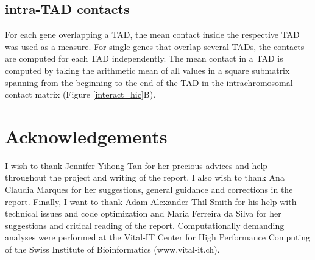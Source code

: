 \documentclass[11pt,a4paper]{report}
\begin{document}
\subsection*{intra-TAD contacts}

For each gene overlapping a TAD, the mean contact inside the respective TAD was used as a measure. For single genes that overlap several TADs, the contacts are computed for each TAD independently. The mean contact in a TAD is computed by taking the arithmetic mean of all values in a square submatrix spanning from the beginning to the end of the TAD in the intrachromosomal contact matrix (Figure \ref{interact_hic}B).

\section*{Acknowledgements}
I wish to thank Jennifer Yihong Tan for her precious advices and help throughout the project and writing of the report. I also wish to thank Ana Claudia Marques for her suggestions, general guidance and corrections in the report. Finally, I want to thank Adam Alexander Thil Smith for  his help with technical issues and code optimization and Maria Ferreira da Silva for her suggestions and critical reading of the report.
Computationally demanding analyses were performed at the Vital-IT Center for High Performance Computing of the Swiss Institute of Bioinformatics (www.vital-it.ch).


\fancyhead[L]{\slshape }

\end{document}
